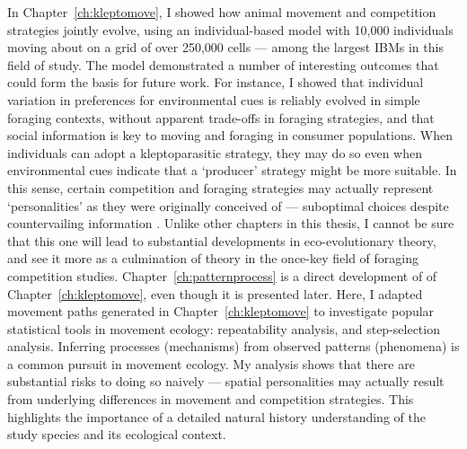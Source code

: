 In Chapter~\ref{ch:kleptomove}, I showed how animal movement and competition strategies jointly evolve, using an individual-based model with 10,000 individuals moving about on a grid of over 250,000 cells --- among the largest IBMs in this field of study.
The model demonstrated a number of interesting outcomes that could form the basis for future work.
For instance, I showed that individual variation in preferences for environmental cues is reliably evolved in simple foraging contexts, without apparent trade-offs in foraging strategies, and that social information is key to moving and foraging in consumer populations.
When individuals can adopt a kleptoparasitic strategy, they may do so even when environmental cues indicate that a `producer' strategy \parencite{beauchamp2008} might be more suitable.
In this sense, certain competition and foraging strategies may actually represent `personalities' as they were originally conceived of --- suboptimal choices despite countervailing information \parencite{sih2004}.
Unlike other chapters in this thesis, I cannot be sure that this one will lead to substantial developments in eco-evolutionary theory, and see it more as a culmination of theory in the once-key field of foraging competition studies.
Chapter~\ref{ch:patternprocess} is a direct development of of Chapter~\ref{ch:kleptomove}, even though it is presented later.
Here, I adapted movement paths generated in Chapter~\ref{ch:kleptomove} to investigate popular statistical tools in movement ecology: repeatability analysis, and step-selection analysis.
Inferring processes (mechanisms) from observed patterns (phenomena) is a common pursuit in movement ecology.
My analysis shows that there are substantial risks to doing so naively --- spatial personalities \parencite{stuber2022} may actually result from underlying differences in movement and competition strategies.
This highlights the importance of a detailed natural history understanding of the study species and its ecological context.

